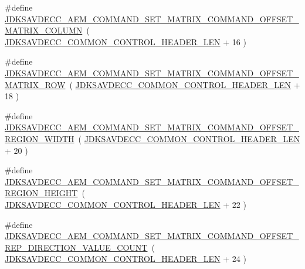 \begin{DoxyCompactItemize}
\item 
\#define \hyperlink{group__command__set__matrix_ga90821891934c85fa44f2553d04596877}{J\+D\+K\+S\+A\+V\+D\+E\+C\+C\+\_\+\+A\+E\+M\+\_\+\+C\+O\+M\+M\+A\+N\+D\+\_\+\+S\+E\+T\+\_\+\+M\+A\+T\+R\+I\+X\+\_\+\+C\+O\+M\+M\+A\+N\+D\+\_\+\+O\+F\+F\+S\+E\+T\+\_\+\+M\+A\+T\+R\+I\+X\+\_\+\+C\+O\+L\+U\+MN}~( \hyperlink{group__jdksavdecc__avtp__common__control__header_gaae84052886fb1bb42f3bc5f85b741dff}{J\+D\+K\+S\+A\+V\+D\+E\+C\+C\+\_\+\+C\+O\+M\+M\+O\+N\+\_\+\+C\+O\+N\+T\+R\+O\+L\+\_\+\+H\+E\+A\+D\+E\+R\+\_\+\+L\+EN} + 16 )
\item 
\#define \hyperlink{group__command__set__matrix_gaa1c513a26ad865120518295322299b40}{J\+D\+K\+S\+A\+V\+D\+E\+C\+C\+\_\+\+A\+E\+M\+\_\+\+C\+O\+M\+M\+A\+N\+D\+\_\+\+S\+E\+T\+\_\+\+M\+A\+T\+R\+I\+X\+\_\+\+C\+O\+M\+M\+A\+N\+D\+\_\+\+O\+F\+F\+S\+E\+T\+\_\+\+M\+A\+T\+R\+I\+X\+\_\+\+R\+OW}~( \hyperlink{group__jdksavdecc__avtp__common__control__header_gaae84052886fb1bb42f3bc5f85b741dff}{J\+D\+K\+S\+A\+V\+D\+E\+C\+C\+\_\+\+C\+O\+M\+M\+O\+N\+\_\+\+C\+O\+N\+T\+R\+O\+L\+\_\+\+H\+E\+A\+D\+E\+R\+\_\+\+L\+EN} + 18 )
\item 
\#define \hyperlink{group__command__set__matrix_gaaf7c47c205acf6a292c66044149c9c91}{J\+D\+K\+S\+A\+V\+D\+E\+C\+C\+\_\+\+A\+E\+M\+\_\+\+C\+O\+M\+M\+A\+N\+D\+\_\+\+S\+E\+T\+\_\+\+M\+A\+T\+R\+I\+X\+\_\+\+C\+O\+M\+M\+A\+N\+D\+\_\+\+O\+F\+F\+S\+E\+T\+\_\+\+R\+E\+G\+I\+O\+N\+\_\+\+W\+I\+D\+TH}~( \hyperlink{group__jdksavdecc__avtp__common__control__header_gaae84052886fb1bb42f3bc5f85b741dff}{J\+D\+K\+S\+A\+V\+D\+E\+C\+C\+\_\+\+C\+O\+M\+M\+O\+N\+\_\+\+C\+O\+N\+T\+R\+O\+L\+\_\+\+H\+E\+A\+D\+E\+R\+\_\+\+L\+EN} + 20 )
\item 
\#define \hyperlink{group__command__set__matrix_ga25c13d7a5ba3afe314c391b1573b7206}{J\+D\+K\+S\+A\+V\+D\+E\+C\+C\+\_\+\+A\+E\+M\+\_\+\+C\+O\+M\+M\+A\+N\+D\+\_\+\+S\+E\+T\+\_\+\+M\+A\+T\+R\+I\+X\+\_\+\+C\+O\+M\+M\+A\+N\+D\+\_\+\+O\+F\+F\+S\+E\+T\+\_\+\+R\+E\+G\+I\+O\+N\+\_\+\+H\+E\+I\+G\+HT}~( \hyperlink{group__jdksavdecc__avtp__common__control__header_gaae84052886fb1bb42f3bc5f85b741dff}{J\+D\+K\+S\+A\+V\+D\+E\+C\+C\+\_\+\+C\+O\+M\+M\+O\+N\+\_\+\+C\+O\+N\+T\+R\+O\+L\+\_\+\+H\+E\+A\+D\+E\+R\+\_\+\+L\+EN} + 22 )
\item 
\#define \hyperlink{group__command__set__matrix_ga046bd8c9f94cd704fb0ef3b014a9bd85}{J\+D\+K\+S\+A\+V\+D\+E\+C\+C\+\_\+\+A\+E\+M\+\_\+\+C\+O\+M\+M\+A\+N\+D\+\_\+\+S\+E\+T\+\_\+\+M\+A\+T\+R\+I\+X\+\_\+\+C\+O\+M\+M\+A\+N\+D\+\_\+\+O\+F\+F\+S\+E\+T\+\_\+\+R\+E\+P\+\_\+\+D\+I\+R\+E\+C\+T\+I\+O\+N\+\_\+\+V\+A\+L\+U\+E\+\_\+\+C\+O\+U\+NT}~( \hyperlink{group__jdksavdecc__avtp__common__control__header_gaae84052886fb1bb42f3bc5f85b741dff}{J\+D\+K\+S\+A\+V\+D\+E\+C\+C\+\_\+\+C\+O\+M\+M\+O\+N\+\_\+\+C\+O\+N\+T\+R\+O\+L\+\_\+\+H\+E\+A\+D\+E\+R\+\_\+\+L\+EN} + 24 )

\end{DoxyCompactItemize}

